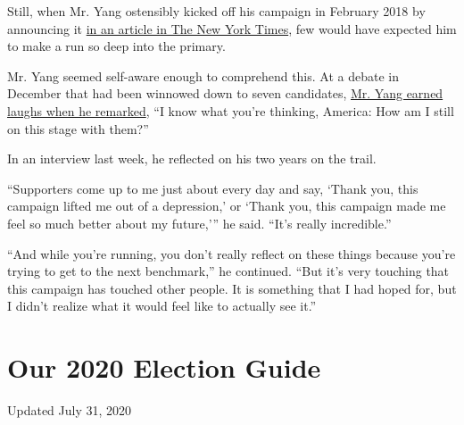 Still, when Mr. Yang ostensibly kicked off his campaign in February 2018
by announcing it
\href{https://www.nytimes.com/2018/02/10/technology/his-2020-campaign-message-the-robots-are-coming.html}{in
an article in The New York Times}, few would have expected him to make a
run so deep into the primary.

Mr. Yang seemed self-aware enough to comprehend this. At a debate in
December that had been winnowed down to seven candidates,
\href{https://www.youtube.com/watch?v=Xo8Vc7qHXWc}{Mr. Yang earned
laughs when he remarked}, ``I know what you're thinking, America: How am
I still on this stage with them?''

In an interview last week, he reflected on his two years on the trail.

``Supporters come up to me just about every day and say, `Thank you,
this campaign lifted me out of a depression,' or `Thank you, this
campaign made me feel so much better about my future,''' he said. ``It's
really incredible.''

``And while you're running, you don't really reflect on these things
because you're trying to get to the next benchmark,'' he continued.
``But it's very touching that this campaign has touched other people. It
is something that I had hoped for, but I didn't realize what it would
feel like to actually see it.''

\hypertarget{our-2020-election-guide}{%
\section{Our 2020 Election Guide}\label{our-2020-election-guide}}

Updated July 31, 2020

